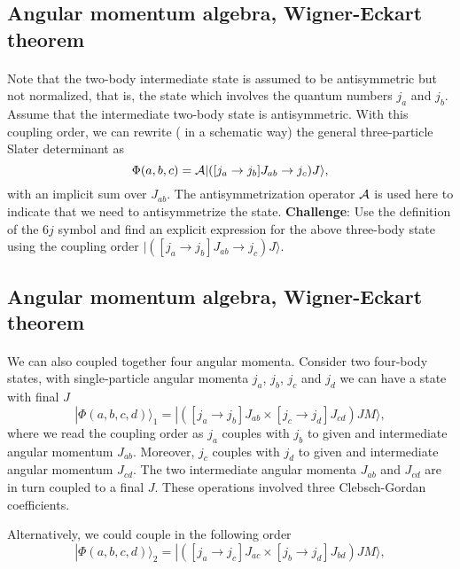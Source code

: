 \documentclass[%
twoside,                 %
final,                   %
10pt]{article}
\begin{document}
\subsection{Angular momentum algebra, Wigner-Eckart theorem}

\paragraph{}
Note that the two-body intermediate state is assumed to be antisymmetric but
not normalized, that is, the state which involves the quantum numbers 
$j_a$ and $j_b$. Assume that the intermediate 
two-body state is antisymmetric. With this coupling order, we can 
rewrite ( in a schematic way) the general three-particle Slater determinant as 
\[
\Phi(a,b,c) = {\cal A} | ([j_a\rightarrow j_b]J_{ab}\rightarrow j_c) J\rangle, 
\]
with an implicit sum over $J_{ab}$.  The antisymmetrization operator ${\cal A}$ is used here to indicate that we need to antisymmetrize the state. \textbf{Challenge}: Use the definition of the $6j$ symbol and find an explicit 
expression for the above three-body state using the coupling order $| ([j_a\rightarrow j_b]J_{ab}\rightarrow j_c) J\rangle$.



\subsection{Angular momentum algebra, Wigner-Eckart theorem}

\paragraph{}
We can also coupled together four angular momenta. Consider two four-body states, with single-particle angular momenta $j_a$, $j_b$, $j_c$ and $j_d$ we can have a state with final $J$
\[
|\Phi(a,b,c,d)\rangle_1 = | ([j_a\rightarrow j_b]J_{ab}\times [j_c\rightarrow j_d]J_{cd}) JM\rangle, 
\]
where we read the coupling order as $j_a$ couples with $j_b$ to given and intermediate angular momentum $J_{ab}$. 
Moreover, $j_c$ couples with $j_d$ to given and intermediate angular momentum $J_{cd}$.  The two intermediate angular momenta $J_{ab}$ and $J_{cd}$
are in turn coupled to a final $J$.  These operations involved three Clebsch-Gordan coefficients. 

Alternatively, we could couple in the following order
\[
|\Phi(a,b,c,d)\rangle_2 = | ([j_a\rightarrow j_c]J_{ac}\times [j_b\rightarrow j_d]J_{bd}) JM\rangle, 
\]
\end{document}

